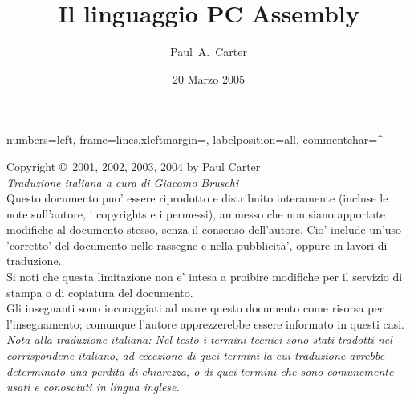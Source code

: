 \documentclass[11pt]{book}
\author{Paul~A.~Carter}
\title{Il linguaggio PC Assembly}
\date{20 Marzo 2005}
\newif\ifmypdf
\begin{document}
\maketitle
\newlength{\AsmMargin}
\setlength{\AsmMargin}{-1cm}
{numbers=left, frame=lines,xleftmargin=\AsmMargin, labelposition=all, commentchar=^ }

\newcommand{\MarginNote}[1]{\marginpar{\sloppy \em \small #1}}
\thispagestyle{empty}
\vspace*{\fill}
\noindent Copyright \copyright\  2001, 2002, 2003, 2004 by Paul Carter\\

\noindent \emph{Traduzione italiana a cura di Giacomo Bruschi}\\

\noindent Questo documento puo' essere riprodotto e distribuito interamente (incluse le note sull'autore, i copyrights e i permessi), ammesso che non siano apportate modifiche al documento stesso, senza il consenso dell'autore. Cio' include un'uso 'corretto' del documento nelle rassegne e nella pubblicita', oppure in lavori di traduzione.\\

\noindent Si noti che questa limitazione non e' intesa a proibire modifiche per il servizio di stampa o di copiatura del documento. \\

\noindent Gli insegnanti sono incoraggiati ad usare questo documento come risorsa per l'insegnamento; comunque l'autore apprezzerebbe essere informato in questi casi.\\

\noindent \emph{Nota alla traduzione italiana: Nel testo i termini tecnici sono
stati tradotti nel corrispondene italiano, ad eccezione di quei termini la cui
traduzione avrebbe determinato una perdita di chiarezza, o di quei termini che sono 
comunemente usati e conosciuti in lingua inglese.}


\vfill
\frontmatter


\mainmatter







%
\begin{appendix}

\end{appendix}
\clearpage
\ifmypdf
\phantomsection %
\fi
{}
\printindex
\end{document}
